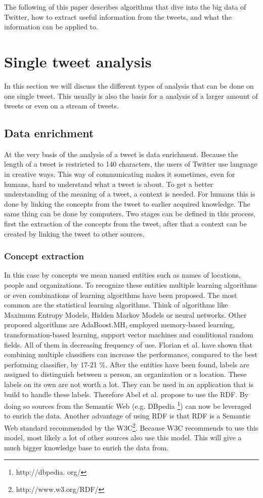 \documentclass{article}
\begin{document}
The following of this paper describes algorithms that dive into the big data of Twitter, how to extract useful information from the tweets, and what the information can be applied to.


\section{Single tweet analysis}
In this section we will discuss the different types of analysis that can be done on one single tweet. This usually is also the basis for a analysis of a larger amount of tweets or even on a stream of tweets. 
\subsection{Data enrichment}
At the very basis of the analysis of a tweet is data enrichment. Because the length of a tweet is restricted to 140 characters, the users of Twitter use language in creative ways. This way of communicating makes it sometimes, even for humans, hard to understand what a tweet is about. To get a better understanding of the meaning of a tweet, a context is needed. For humans this is done by linking the concepts from the tweet to earlier acquired knowledge. The same thing can be done by computers. Two stages can be defined in this process, first the extraction of the concepts from the tweet, after that a context can be created by linking the tweet to other sources.
\subsubsection{Concept extraction}
In this case by concepts we mean named entities such as names of locations, people and organizations. To recognize these entities multiple learning algorithms or even combinations of learning algorithms have been proposed. The most common are the statistical learning algorithms. Think of algorithms like Maximum Entropy Models, Hidden Markov Models or neural networks. Other proposed algorithms are AdaBoost.MH, employed memory-based learning, transformation-based learning, support vector machines and conditional random fields. All of them in decreasing frequency of use.\cite{EntityRecognition} Florian et al. have shown that combining multiple classifiers can increase the performance, compared to the best performing classifier, by 17-21 \%.\cite{ClassifierCombination} After the entities have been found, labels are assigned to distinguish between a person, an organization or a location. These labels on its own are not worth a lot. They can be used in an application that is build to handle these labels. Therefore 
Abel et al. propose to use the RDF.\cite{AdaptiveSearch} By doing so sources from the Semantic Web (e.g. DBpedia \footnote{http://dbpedia.
org/}) can now be leveraged to enrich the data. Another advantage of using RDF is that RDF is a Semantic Web standard recommended by the W3C\footnote{http://www.w3.org/RDF/}. Because W3C recommends to use this model, most likely a lot of other sources also use this model. This will give a much bigger knowledge base to enrich the data from.
\end{document}
